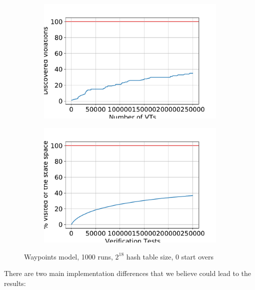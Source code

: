 \documentclass[
fancyheadings, %
%
%
]{stsreprt}
\begin{document}
\begin{figure}[h]
    \begin{subfigure}[b]{.5\textwidth}
        \centering
        \includegraphics[width=\textwidth]{figures/experiments/output1-discovered-violations-abs-numbers.pdf}
    \end{subfigure}
    \begin{subfigure}[b]{.5\textwidth}
        \centering
        \includegraphics[width=\textwidth]{figures/experiments/output1-covered-state-space-in-percent.pdf}
    \end{subfigure}
    \caption{Waypoints model, \num{1000} runs, $2^{18}$ hash table size, 0 start overs}
    \label{fig:experiments:output1}
\end{figure}

There are two main implementation differences that we believe could lead to the results:
\end{document}
